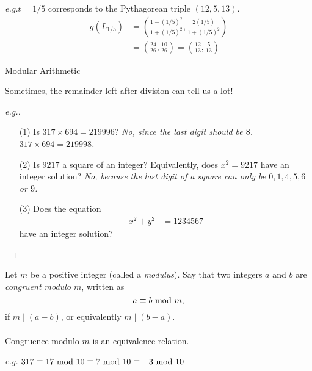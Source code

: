 \emph{e.g.}\quad $t = 1/5$ corresponds to the Pythagorean triple $(12,5,13)$.
\begin{align*}
g(L_{1/5}) &= \left(\frac{1-(1/5)^2}{1+(1/5)^2},\frac{2(1/5)}{1+(1/5)^2}\right)\\[0.5em]
&= \left(\frac{24}{26},\frac{10}{26}\right) = \left(\frac{12}{13},\frac{5}{13}\right)
\end{align*}


\begin{center}
{\Large Modular Arithmetic}
\end{center}

Sometimes, the remainder left after division can tell us a lot!
\begin{proof}[e.g.]\renewcommand{\qedsymbol}{}
\begin{itemize}
\item[(1)] Is $317 \times 694 = 219996$? \emph{No, since the last digit should be $8$. $317 \times 694 = 219998$.}
\end{itemize}
\begin{itemize}[leftmargin=4.4em]
\item[(2)] Is $9217$ a square of an integer? Equivalently, does $x^2 = 9217$ have an integer solution? \emph{No, because the last digit of a square can only be $0,1,4,5,6$ or $9$.}
\item[(3)] Does the equation 
\begin{align*}\label{intsol}
x^2 + y^2 &= 1234567 \tag{$\dagger$}
\end{align*}
have an integer solution?
\end{itemize}
\end{proof}

\begin{definition}
Let $m$ be a positive integer (called a \emph{modulus}). Say that two integers $a$ and $b$ are \emph{congruent modulo $m$}, written as
\[a\equiv b\text{ mod }{m},\]
if $m\mid (a-b)$, or equivalently $m\mid (b-a)$.\\
\\
Congruence modulo $m$ is an equivalence relation.
\end{definition}
\emph{e.g.} $317 \equiv 17\text{ mod }{10} \equiv 7\text{ mod }{10} \equiv -3\text{ mod }{10}$

\vspace*{1.5em}

